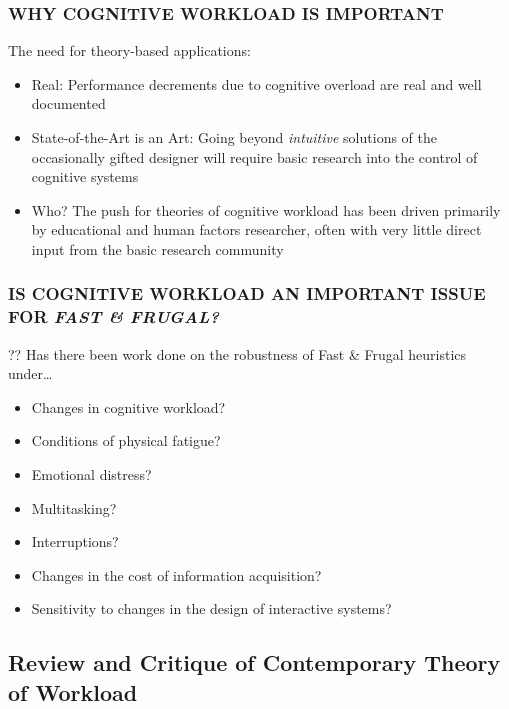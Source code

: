 \documentclass{beamer}
\begin{document}
 \begin{frame}
	\frametitle{WHY COGNITIVE WORKLOAD IS IMPORTANT}
	The need for theory-based applications:
	\begin{itemize}
		\item Real: Performance decrements due to cognitive overload are real and well documented
		\item State-of-the-Art is an Art: Going beyond \emph{intuitive} solutions of the occasionally gifted designer will require basic research into the control of cognitive systems
		\item Who? The push for theories of cognitive workload has been driven primarily by educational and human factors researcher, often with very little direct input from the basic research community
	\end{itemize}
\end{frame}

 \begin{frame}
	\frametitle{IS COGNITIVE WORKLOAD AN IMPORTANT ISSUE FOR \emph{FAST \& FRUGAL?}}
	?? Has there been work done on the robustness of Fast \& Frugal heuristics under\dots
	\pause
	\begin{itemize}
		\item Changes in cognitive workload?
		\item Conditions of physical fatigue?
		\item Emotional distress?
		\item Multitasking?
		\item Interruptions?
		\item Changes in the cost of information acquisition?
		\item Sensitivity to changes in the design of interactive systems?
	\end{itemize}
\end{frame}


\subsection{Review and Critique of Contemporary Theory of Workload}
\end{document}
